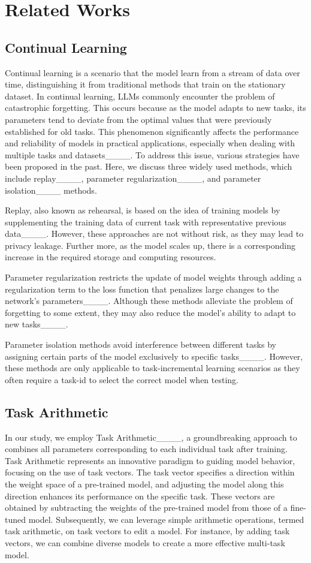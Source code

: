 \section{Related Works}
\label{sec2}
\subsection{Continual Learning}
Continual learning is a scenario that the model learn from a stream of data over time, distinguishing it from traditional methods that train on the stationary dataset.
In continual learning, LLMs commonly encounter the problem of catastrophic forgetting. This occurs because as the model adapts to new tasks, its parameters tend to deviate from the optimal values that were previously established for old tasks. This phenomenon significantly affects the performance and reliability of models in practical applications, especially when dealing with multiple tasks and datasets____. To address this issue, various strategies have been proposed in the past. Here, we discuss three widely used methods, which include replay____, parameter regularization____, and parameter isolation____ methods.

Replay, also known as rehearsal, is based on the idea of training models by supplementing the training data of current task with representative previous data____. However, these approaches are not without risk, as they may lead to privacy leakage. Further more, as the model scales up, there is a corresponding increase in the required storage and computing resources. 

Parameter regularization restricts the update of model weights through adding a regularization term to the loss function that penalizes large changes to the network's parameters____. Although these methods alleviate the problem of forgetting to some extent, they may also reduce the model's ability to adapt to new tasks____. 

Parameter isolation methods avoid interference between different tasks by assigning certain parts of the model exclusively to specific tasks____. However, these methods are only applicable to task-incremental learning scenarios as they often require a task-id to select the correct model when testing.

\subsection{Task Arithmetic}
In our study, we employ Task Arithmetic____, a groundbreaking approach to combines all parameters corresponding to each individual task after training. Task Arithmetic represents an innovative paradigm to guiding model behavior, focusing on the use of task vectors. The task vector specifies a direction within the weight space of a pre-trained model, and adjusting the model along this direction enhances its performance on the specific task. These vectors are obtained by subtracting the weights of the pre-trained model from those of a fine-tuned model. Subsequently, we can leverage simple arithmetic operations, termed task arithmetic, on task vectors to edit a model. For instance, by adding task vectors, we can combine diverse models to create a more effective multi-task model.